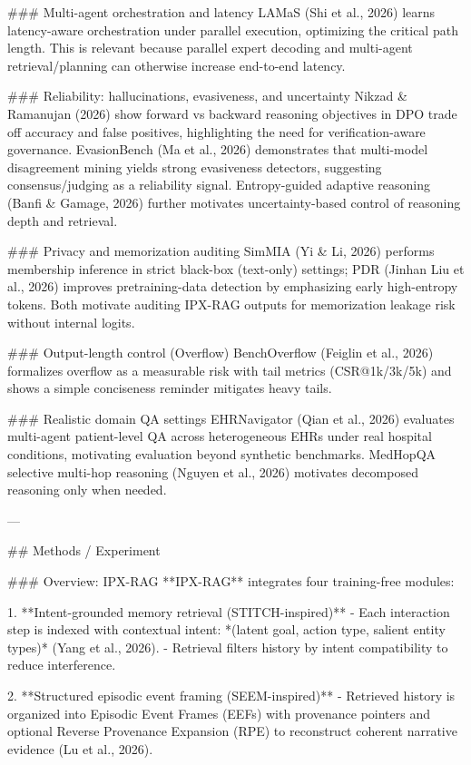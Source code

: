 ### Multi-agent orchestration and latency  
LAMaS (Shi et al., 2026) learns latency-aware orchestration under parallel execution, optimizing the critical path length. This is relevant because parallel expert decoding and multi-agent retrieval/planning can otherwise increase end-to-end latency.

### Reliability: hallucinations, evasiveness, and uncertainty  
Nikzad & Ramanujan (2026) show forward vs backward reasoning objectives in DPO trade off accuracy and false positives, highlighting the need for verification-aware governance. EvasionBench (Ma et al., 2026) demonstrates that multi-model disagreement mining yields strong evasiveness detectors, suggesting consensus/judging as a reliability signal. Entropy-guided adaptive reasoning (Banfi & Gamage, 2026) further motivates uncertainty-based control of reasoning depth and retrieval.

### Privacy and memorization auditing  
SimMIA (Yi & Li, 2026) performs membership inference in strict black-box (text-only) settings; PDR (Jinhan Liu et al., 2026) improves pretraining-data detection by emphasizing early high-entropy tokens. Both motivate auditing IPX-RAG outputs for memorization leakage risk without internal logits.

### Output-length control (Overflow)  
BenchOverflow (Feiglin et al., 2026) formalizes overflow as a measurable risk with tail metrics (CSR@1k/3k/5k) and shows a simple conciseness reminder mitigates heavy tails.

### Realistic domain QA settings  
EHRNavigator (Qian et al., 2026) evaluates multi-agent patient-level QA across heterogeneous EHRs under real hospital conditions, motivating evaluation beyond synthetic benchmarks. MedHopQA selective multi-hop reasoning (Nguyen et al., 2026) motivates decomposed reasoning only when needed.

---

## Methods / Experiment  

### Overview: IPX-RAG  
**IPX-RAG** integrates four training-free modules:

1. **Intent-grounded memory retrieval (STITCH-inspired)**  
   - Each interaction step is indexed with contextual intent: *(latent goal, action type, salient entity types)* (Yang et al., 2026).  
   - Retrieval filters history by intent compatibility to reduce interference.

2. **Structured episodic event framing (SEEM-inspired)**  
   - Retrieved history is organized into Episodic Event Frames (EEFs) with provenance pointers and optional Reverse Provenance Expansion (RPE) to reconstruct coherent narrative evidence (Lu et al., 2026).

